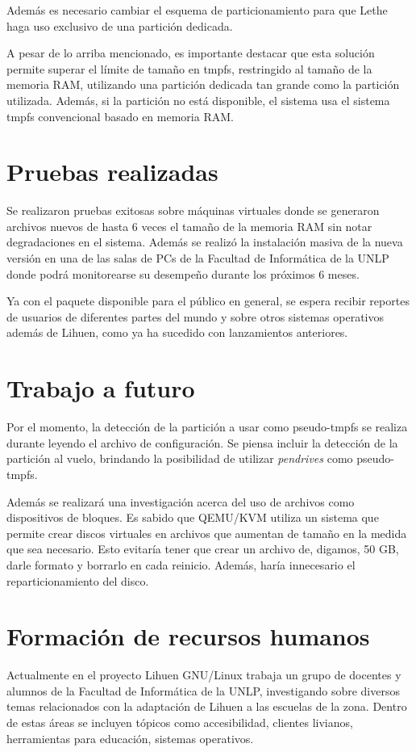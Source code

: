 \documentclass[final,narroweqnarray,inline,twoside]{ieee}
\begin{document}
Además es necesario cambiar el esquema de particionamiento para que Lethe haga uso exclusivo de una partición dedicada.

A pesar de lo arriba mencionado, es importante destacar que esta solución permite superar el límite de tamaño en tmpfs,
restringido al tamaño de la memoria RAM, utilizando una partición
dedicada tan grande como la partición utilizada. Además, si la partición no está disponible, el sistema usa el sistema tmpfs
convencional basado en memoria RAM.

\section{Pruebas realizadas}
Se realizaron pruebas exitosas sobre máquinas virtuales donde se generaron archivos nuevos de hasta 6 veces el tamaño de la
memoria RAM sin notar degradaciones en el sistema. Además se realizó la instalación masiva de la nueva versión en una de las
salas de PCs de la Facultad de Informática de la UNLP donde podrá monitorearse su desempeño durante los próximos 6
meses.

Ya con el paquete disponible para el público en general, se espera recibir reportes de usuarios de diferentes partes del
mundo y sobre otros sistemas operativos además de Lihuen, como ya ha sucedido con lanzamientos anteriores.

\section{Trabajo a futuro}
Por el momento, la detección de la partición a usar como pseudo-tmpfs se realiza durante leyendo el archivo de
configuración. Se piensa incluir la detección de la partición al vuelo, brindando la posibilidad de utilizar
\textit{pendrives} como pseudo-tmpfs.

Además se realizará una investigación acerca del uso de archivos como dispositivos de bloques. Es sabido que QEMU/KVM utiliza
un sistema que permite crear discos virtuales en archivos que aumentan de tamaño en la medida que sea necesario. Esto
evitaría tener que crear un archivo de, digamos, 50 GB, darle formato y borrarlo en cada reinicio. Además, haría innecesario
el reparticionamiento del disco.

\section{Formación de recursos humanos}
Actualmente en el proyecto Lihuen GNU/Linux trabaja un grupo de docentes y 
alumnos de la Facultad de Informática de la
UNLP, investigando sobre diversos temas relacionados con la adaptación de Lihuen
a las escuelas de la zona. Dentro de estas
áreas se incluyen tópicos como accesibilidad, clientes livianos, herramientas
para educación, sistemas operativos. 
\end{document}
